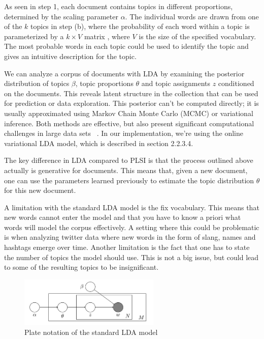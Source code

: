 \documentclass[12pt]{report}
\begin{document}
As seen in step 1, each document contains topics in different proportions,
determined by the scaling parameter $\alpha$. The individual words are drawn
from one of the $k$ topics in step (b), where the probability of each word
within a topic is parameterized by a $k \times V$ matrix , where $V$ is the
size of the specified vocabulary. The most probable words in each topic could
be used to identify the topic and gives an intuitive description for the topic.

We can analyze a corpus of documents with LDA by examining the posterior
distribution of topics $\beta$, topic proportions $\theta$ and topic
assignments $z$ conditioned on the documents. This reveals latent structure in
the collection that can be used for prediction or data exploration. This
posterior can't be computed directly; it is usually approximated using Markov
Chain Monte Carlo (MCMC) or variational inference. Both methods are effective,
but also present significant computational challenges in large data sets
~\cite{onlineLDAvb}. In our implementation, we're using the online variational
LDA model, which is described in section 2.2.3.4.
 
The key difference in LDA compared to PLSI is that the process outlined above
actually is generative for documents. This means that, given a new document,
one can use the parameters learned previously to estimate the topic
distribution $\theta$ for this new document.
 
A limitation with the standard LDA model is the fix vocabulary. This means that
new words cannot enter the model and that you have to know a priori what words
will model the corpus effectively. A setting where this could be problematic is
when analyzing twitter data where new words in the form of slang, names and
hashtags emerge over time. Another limitation is the fact that one has to state
the number of topics the model should use. This is not a big issue, but could
lead to some of the resulting topics to be insignificant.

\begin{center}
\begin{figure}
\centering
\includegraphics[width=0.6\textwidth]{LDA_standard_model.png}
\caption{Plate notation of the standard LDA model}
\end{figure}
\end{center}
\end{document}
